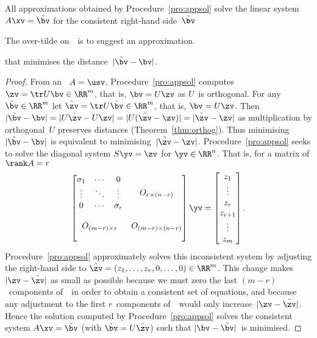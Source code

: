 \begin{theorem} \label{thm:appsol} 
All approximations obtained by Procedure~\ref{pro:appsol} solve the linear system \(A\xv=\tilde\bv\) for the consistent right-hand side~\(\tilde\bv\) 
\begin{aside} The over-tilde on~\bv\ is to suggest an approximation. \end{aside}%
that minimises the distance~\(|\tilde\bv-\bv|\).
\end{theorem}
\begin{proof} 
From an \svd\ \(A=\usv\), Procedure~\ref{pro:appsol} computes \(\zv=\tr U\bv\in\RR^m\), that is, \(\bv=U\zv\) as \(U\)~is orthogonal.
For any \(\tilde\bv\in\RR^m\) let \(\tilde\zv=\tr U\tilde\bv\in\RR^m\), that is, \(\bv=U\zv\).
Then \(|\tilde\bv-\bv|=|U\tilde\zv-U\zv|=|U(\tilde\zv-\zv)|=|\tilde\zv-\zv|\) as multiplication by orthogonal~\(U\) preserves distances (Theorem~\ref{thm:orthog}).
Thus minimising~\(|\tilde\bv-\bv|\) is equivalent to minimising~\(|\tilde\zv-\zv|\).
Procedure~\ref{pro:appsol} seeks to solve the diagonal system \(S\yv=\zv\) for \(\yv\in\RR^n\). 
That is, for a matrix of \(\rank A=r\)
\begin{equation*}
\begin{bmatrix} \begin{matrix} \sigma_1&\cdots&0\\
\vdots&\ddots&\vdots\\
0&\cdots&\sigma_r \end{matrix} & 
O_{r\times (n-r)}\\\,\\
O_{(m-r)\times r}&O_{(m-r)\times (n-r)}
\\\,\end{bmatrix}\yv
=\begin{bmatrix} z_1\\\vdots\\z_r\\z_{r+1}\\\vdots\\z_m \end{bmatrix}.
\end{equation*}
Procedure~\ref{pro:appsol} approximately solves this inconsistent system by adjusting the right-hand side to \(\tilde\zv=(z_1,\ldots,z_r,0,\ldots,0)\in\RR^m\).
This change makes \(|\zv-\tilde\zv|\) as small as possible because we must zero the last \((m-r)\)~components of~\zv\ in order to obtain a consistent set of equations, and because any adjustment to the first \(r\)~components of~\zv\ would only increase~\(|\zv-\tilde\zv|\).
Hence the solution computed by Procedure~\ref{pro:appsol} solves the consistent system \(A\xv=\tilde\bv\) (with \(\tilde\bv=U\tilde\zv\)) such that \(|\bv-\tilde\bv|\)~is minimised.
\end{proof}




